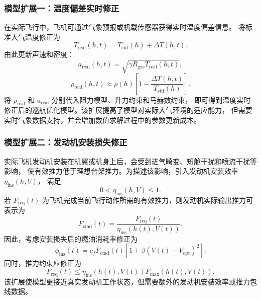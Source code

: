 \documentclass[UTF8]{ctexart}
\begin{document}
\subsubsection{模型扩展一：温度偏差实时修正}

在实际飞行中，飞机可通过气象预报或机载传感器获得实时温度偏差信息。
将标准大气温度修正为
\begin{equation}
    T_{\mathrm{real}}(h,t)
    =
    T_{\mathrm{std}}(h)+\Delta T(h,t).
    \label{eq:q4_real_temperature}
\end{equation}
由此更新声速和密度：
\begin{equation}
    a_{\mathrm{real}}(h,t)
    =
    \sqrt{\gamma R_{\mathrm{gas}}T_{\mathrm{real}}(h,t)},
    \label{eq:q4_real_sound}
\end{equation}
\begin{equation}
    \rho_{\mathrm{real}}(h,t)
    \approx
    \rho(h)
    \left[
    1-\frac{\Delta T(h,t)}{T_{\mathrm{std}}(h)}
    \right].
    \label{eq:q4_real_density}
\end{equation}
将 $\rho_{\mathrm{real}}$ 和 $a_{\mathrm{real}}$ 分别代入阻力模型、升力约束和马赫数约束，
即可得到温度实时修正后的巡航优化模型。该扩展提高了模型对实际大气环境的适应能力，
但需要实时气象数据支持，并会增加数值求解过程中的参数更新成本。

\subsubsection{模型扩展二：发动机安装损失修正}

实际飞机发动机安装在机翼或机身上后，会受到进气畸变、短舱干扰和喷流干扰等影响，
使有效推力低于理想台架推力。为描述该影响，引入发动机安装效率 $\eta_{\mathrm{ins}}(h,V)$，
满足
\begin{equation}
    0<\eta_{\mathrm{ins}}(h,V)\leq 1.
    \label{eq:q4_eta_install}
\end{equation}
若 $F_{\mathrm{req}}(t)$ 为飞机完成当前飞行动作所需的有效推力，则发动机实际输出推力可表示为
\begin{equation}
    F_{\mathrm{cmd}}(t)
    =
    \frac{F_{\mathrm{req}}(t)}{\eta_{\mathrm{ins}}(h(t),V(t))}.
    \label{eq:q4_install_thrust}
\end{equation}
因此，考虑安装损失后的燃油消耗率修正为
\begin{equation}
    \phi_{\mathrm{ins}}(t)
    =
    c_fF_{\mathrm{cmd}}(t)
    \left[
    1+\beta\left(V(t)-V_{\mathrm{opt}}\right)^2
    \right].
    \label{eq:q4_install_fuel}
\end{equation}
同时，推力约束应修正为
\begin{equation}
    F_{\mathrm{req}}(t)
    \leq
    \eta_{\mathrm{ins}}(h(t),V(t))F_{\max}(h(t),V(t)).
    \label{eq:q4_install_constraint}
\end{equation}
该扩展使模型更接近真实发动机工作状态，但需要额外的发动机安装效率或推力包线数据。
\end{document}
